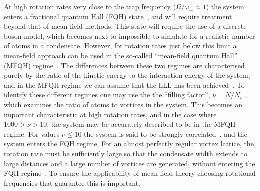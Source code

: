 At high rotation rates very close to the trap frequency ($\Omega/\omega_\perp \approx 1$) the system enters a fractional quantum Hall (FQH) state~\cite{Vtx:Regnault_prl_2003}, and will require treatment beyond that of mean-field methods. This state will require the use of a discrete boson model, which becomes next to impossible to simulate for a realistic number of atoms in a condensate. However, for rotation rates just below this limit a mean-field approach can be used in the so-called ``mean-field quantum Hall'' (MFQH) regime~\cite{BEC:Fetter_revmodphys_2009}. The differences between these two regimes are characterised purely by the ratio of the kinetic energy to the interaction energy of the system, and in the MFQH regime we can assume that the LLL has been achieved~\cite{Vtx:Zhai_pra_2004,BEC:Stock_laserphyslett_2005}. To identify these different regimes one may use the the ``filling factor'', $\nu=N/N_v$ \cite{BK:Ueda_2010,Vtx:Ho_prl_2001}, which examines the ratio of atoms to vortices in the system. This becomes an important characteristic at high rotation rates, and in the case where $1000 > \nu > 10$, the system may be accurately described to be in the MFQH regime. For values $\nu \leq 10$ the system is said to be strongly correlated~\cite{BEC:Fetter_revmodphys_2009}, and the system enters the FQH regime. For an almost perfectly regular vortex lattice, the rotation rate must be sufficiently large so that the condensate width extends to large distances and a large number of vortices are generated, without entering the FQH regime~\cite{Vtx:Aftalion_pra_2005}. To ensure the applicability of mean-field theory choosing rotational frequencies that guarantee this is important.

